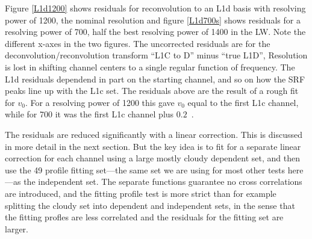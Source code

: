 \documentclass[11pt]{article}
\begin{document}
Figure \ref{L1d1200} shows residuals for reconvolution to an L1d
basis with resolving power of 1200, the nominal {\airs} resolution
and figure \ref{L1d700s} shows residuals for a resolving power of
700, half the best {\airs} resolving power of 1400 in the LW.  Note
the different x-axes in the two figures.  The uncorrected residuals
are for the deconvolution/reconvolution transform ``L1C to D'' minus
``true L1D'', Resolution is lost in shifting channel centers to a
single regular function of frequency.  The L1d residuals dependend
in part on the starting channel, and so on how the SRF peaks line up
with the L1c set.  The residuals above are the result of a rough fit
for $v_0$.  For a resolving power of 1200 this gave $v_0$ equal to
the first L1c channel, while for 700 it was the first L1c channel
plus $0.2$~\wn.

The residuals are reduced significantly with a linear correction.
This is discussed in more detail in the next section.  But the key
idea is to fit for a separate linear correction for each channel
using a large mostly cloudy dependent set, and then use the 49
profile fitting set---the same set we are using for most other tests
here---as the independent set.  The separate functions guarantee no
cross correlations are introduced, and the fitting profile test is
more strict than for example splitting the cloudy set into dependent
and independent sets, in the sense that the fitting profles are less
correlated and the residuals for the fitting set are larger.


\end{document}
